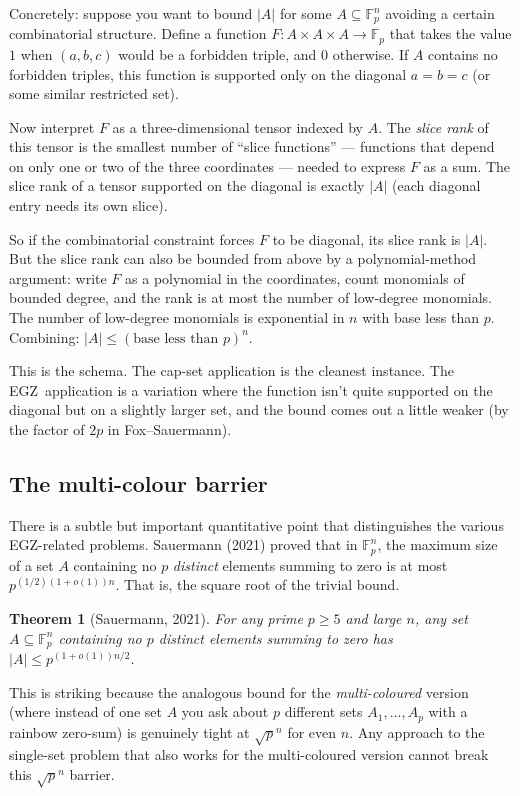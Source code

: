 \documentclass[11pt,a4paper]{article}
\theoremstyle{plain}
\newtheorem{theorem}{Theorem}[section]
\theoremstyle{definition}
\theoremstyle{remark}
\newcommand{\F}{\mathbb{F}}
\newcommand{\EGZ}{\textsf{EGZ}}
\begin{document}
Concretely: suppose you want to bound $|A|$ for some $A \subseteq \F_p^n$ avoiding a certain combinatorial structure. Define a function $F: A \times A \times A \to \F_p$ that takes the value $1$ when $(a, b, c)$ would be a forbidden triple, and $0$ otherwise. If $A$ contains no forbidden triples, this function is supported only on the diagonal $a = b = c$ (or some similar restricted set). 

Now interpret $F$ as a three-dimensional tensor indexed by $A$. The \emph{slice rank} of this tensor is the smallest number of ``slice functions'' --- functions that depend on only one or two of the three coordinates --- needed to express $F$ as a sum. The slice rank of a tensor supported on the diagonal is exactly $|A|$ (each diagonal entry needs its own slice).

So if the combinatorial constraint forces $F$ to be diagonal, its slice rank is $|A|$. But the slice rank can also be bounded from above by a polynomial-method argument: write $F$ as a polynomial in the coordinates, count monomials of bounded degree, and the rank is at most the number of low-degree monomials. The number of low-degree monomials is exponential in $n$ with base less than $p$. Combining: $|A| \leq (\text{base less than } p)^n$.

This is the schema. The cap-set application is the cleanest instance. The \EGZ\ application is a variation where the function isn't quite supported on the diagonal but on a slightly larger set, and the bound comes out a little weaker (by the factor of $2p$ in Fox--Sauermann).

\subsection{The multi-colour barrier}

There is a subtle but important quantitative point that distinguishes the various \EGZ-related problems. Sauermann (2021) proved that in $\F_p^n$, the maximum size of a set $A$ containing no $p$ \emph{distinct} elements summing to zero is at most $p^{(1/2)(1+o(1))n}$. That is, the square root of the trivial bound.

\begin{theorem}[Sauermann, 2021]
\label{thm:sauermann-square-root}
For any prime $p \geq 5$ and large $n$, any set $A \subseteq \F_p^n$ containing no $p$ distinct elements summing to zero has $|A| \leq p^{(1+o(1))n/2}$.
\end{theorem}

This is striking because the analogous bound for the \emph{multi-coloured} version (where instead of one set $A$ you ask about $p$ different sets $A_1, \ldots, A_p$ with a rainbow zero-sum) is genuinely tight at $\sqrt{p}^n$ for even $n$. Any approach to the single-set problem that also works for the multi-coloured version cannot break this $\sqrt{p}^n$ barrier.
\end{document}
